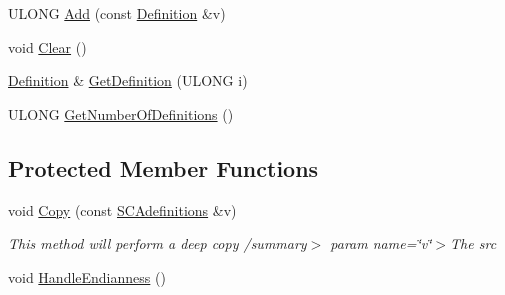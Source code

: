 \begin{DoxyCompactItemize}
\item 
U\+L\+O\+NG \hyperlink{class_canberra_1_1_data_types_1_1_spectroscopy_1_1_s_c_adefinitions_ac63b7209e56a1d255af8f6fe2a8f41de_ac63b7209e56a1d255af8f6fe2a8f41de}{Add} (const \hyperlink{class_canberra_1_1_data_types_1_1_spectroscopy_1_1_s_c_adefinitions_de/d00/struct_canberra_1_1_data_types_1_1_spectroscopy_1_1_s_c_adefinitions_1_1_definition_tag}{Definition} \&v)
\item 
void \hyperlink{class_canberra_1_1_data_types_1_1_spectroscopy_1_1_s_c_adefinitions_a4367fc0b1f01840fec0551aac2dfd339_a4367fc0b1f01840fec0551aac2dfd339}{Clear} ()
\item 
\hyperlink{class_canberra_1_1_data_types_1_1_spectroscopy_1_1_s_c_adefinitions_de/d00/struct_canberra_1_1_data_types_1_1_spectroscopy_1_1_s_c_adefinitions_1_1_definition_tag}{Definition} \& \hyperlink{class_canberra_1_1_data_types_1_1_spectroscopy_1_1_s_c_adefinitions_a2accbcce38d522bd52d87067cfaa184d_a2accbcce38d522bd52d87067cfaa184d}{Get\+Definition} (U\+L\+O\+NG i)
\item 
U\+L\+O\+NG \hyperlink{class_canberra_1_1_data_types_1_1_spectroscopy_1_1_s_c_adefinitions_a4c59b1485f3d8c1884a8e3dacd6d37b0_a4c59b1485f3d8c1884a8e3dacd6d37b0}{Get\+Number\+Of\+Definitions} ()
\end{DoxyCompactItemize}
\subsection*{Protected Member Functions}
\begin{DoxyCompactItemize}
\item 
void \hyperlink{class_canberra_1_1_data_types_1_1_spectroscopy_1_1_s_c_adefinitions_ac1923823c47c1cfd5056df726a1aa472_ac1923823c47c1cfd5056df726a1aa472}{Copy} (const \hyperlink{class_canberra_1_1_data_types_1_1_spectroscopy_1_1_s_c_adefinitions}{S\+C\+Adefinitions} \&v)
\begin{DoxyCompactList}\small\item\em This method will perform a deep copy /summary$>$ param name=\char`\"{}v\char`\"{}$>$The src\end{DoxyCompactList}\item 
void \hyperlink{class_canberra_1_1_data_types_1_1_spectroscopy_1_1_s_c_adefinitions_a693837c5c11189a04ac4ddd7800f54e6_a693837c5c11189a04ac4ddd7800f54e6}{Handle\+Endianness} ()
\end{DoxyCompactItemize}
